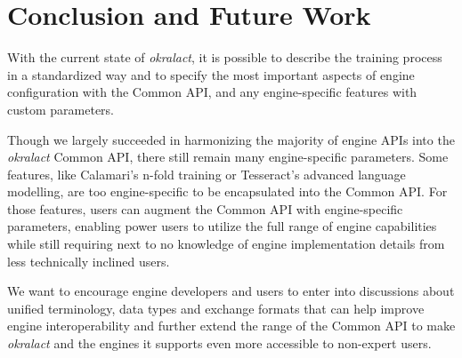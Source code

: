 \documentclass[sigconf]{acmart}
\begin{document}
\section{Conclusion and Future Work}
\label{sec:conclusion}

With the current state of \textit{okralact}, it is possible to describe the
training process in a standardized way and to specify the most important
aspects  of engine configuration with the Common API, and any engine-specific
features with custom parameters.


Though we largely succeeded in harmonizing the majority of engine APIs into the
\textit{okralact} Common API, there still remain many engine-specific parameters. Some
features, like Calamari's n-fold training or Tesseract's advanced language
modelling, are too engine-specific to be encapsulated into the Common API. 
For those features, users can augment the Common API with engine-specific parameters, 
enabling power users to utilize the full range of engine capabilities while still requiring 
next to no knowledge of engine implementation details from less technically inclined users.

We want to encourage engine developers and
users to enter into discussions about unified terminology, data types and exchange 
formats that can help improve engine interoperability and further extend the range of the Common API to
make \textit{okralact} and the engines it supports even more
accessible to non-expert users.
\end{document}

